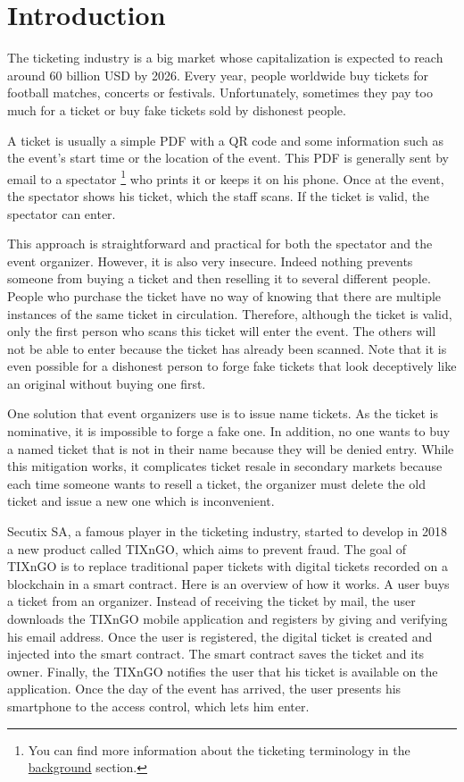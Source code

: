 \documentclass[a4paper,11pt,oneside]{report}
\begin{document}
\maketoc

\chapter{Introduction}
The ticketing industry is a big market whose capitalization is expected to reach around 60 billion USD by 2026. Every year, people worldwide buy tickets for football matches, concerts or festivals. Unfortunately, sometimes they pay too much for a ticket or buy fake tickets sold by dishonest people.

A ticket is usually a simple PDF with a QR code and some information such as the event's start time or the location of the event. This PDF is generally sent by email to a spectator \footnote{You can find more information about the ticketing terminology in the  \hyperref[sec:ticketing_terminology]{background} section.} who prints it or keeps it on his phone. Once at the event, the spectator shows his ticket, which the staff scans. If the ticket is valid, the spectator can enter.

This approach is straightforward and practical for both the spectator and the event organizer. However, it is also very insecure. Indeed nothing prevents someone from buying a ticket and then reselling it to several different people. People who purchase the ticket have no way of knowing that there are multiple instances of the same ticket in circulation. Therefore, although the ticket is valid, only the first person who scans this ticket will enter the event. The others will not be able to enter because the ticket has already been scanned. Note that it is even possible for a dishonest person to forge fake tickets that look deceptively like an original without buying one first.

One solution that event organizers use is to issue name tickets. As the ticket is nominative, it is impossible to forge a fake one. In addition, no one wants to buy a named ticket that is not in their name because they will be denied entry. While this mitigation works, it complicates ticket resale in secondary markets because each time someone wants to resell a ticket, the organizer must delete the old ticket and issue a new one which is inconvenient.

Secutix SA, a famous player in the ticketing industry, started to develop in 2018 a new product called TIXnGO, which aims to prevent fraud. The goal of TIXnGO is to replace traditional paper tickets with digital tickets recorded on a blockchain in a smart contract. Here is an overview of how it works. A user buys a ticket from an organizer. Instead of receiving the ticket by mail, the user downloads the TIXnGO mobile application and registers by giving and verifying his email address. Once the user is registered, the digital ticket is created and injected into the smart contract. The smart contract saves the ticket and its owner. Finally, the TIXnGO notifies the user that his ticket is available on the application. Once the day of the event has arrived, the user presents his smartphone to the access control, which lets him enter.
\end{document}
